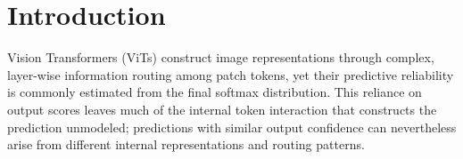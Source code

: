 \documentclass[11pt]{article}
\begin{document}



\section{Introduction}
Vision Transformers (ViTs) \citep{Dosovitskiy2021} construct image representations through complex, layer-wise information routing among patch tokens, yet their predictive reliability is commonly estimated from the final softmax distribution. This reliance on output scores leaves much of the internal token interaction that constructs the prediction unmodeled; predictions with similar output confidence can nevertheless arise from different internal representations and routing patterns.
\end{document}
